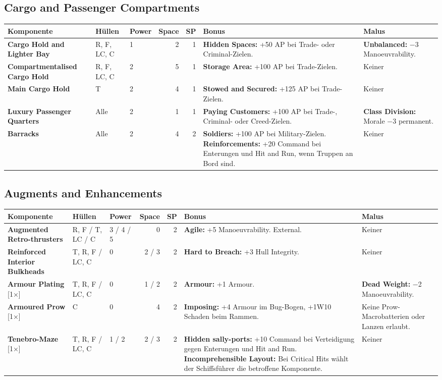 \documentclass[9pt,a4paper]{extarticle}
\newcommand{\plus}[1]{\textcolor{good}{#1}}
\newcommand{\minus}[1]{\textcolor{bad}{#1}}
\newcommand{\nm}[1]{\textbf{#1}}
\newcommand{\eff}[1]{\textbf{#1:}}
\newcommand{\once}{{\monofont\scriptsize\color{ink3}[1×]}}
\begin{document}
\subsection{Cargo and Passenger Compartments}
\begin{xltabular}{\linewidth}{l H P N N Y Y}
\toprule
{}\textbf{Komponente} & \textbf{Hüllen} & \textbf{Power} & \textbf{Space} & \textbf{SP} & \textbf{Bonus} & \textbf{Malus}\\
\midrule
\endhead
\nm{Cargo Hold and Lighter Bay} & R, F, LC, C & 1 & 2 & 1 & \eff{Hidden Spaces} \plus{+50 AP} bei Trade- oder Criminal-Zielen. & \eff{Unbalanced} \minus{−3 Manoeuvrability}.\\
\nm{Compartmentalised Cargo Hold} & R, F, LC, C & 2 & 5 & 1 & \eff{Storage Area} \plus{+100 AP} bei Trade-Zielen. & Keiner\\
\nm{Main Cargo Hold} & T & 2 & 4 & 1 & \eff{Stowed and Secured} \plus{+125 AP} bei Trade-Zielen. & Keiner\\
\nm{Luxury Passenger Quarters} & Alle & 2 & 1 & 1 & \eff{Paying Customers} \plus{+100 AP} bei Trade-, Criminal- oder Creed-Zielen. & \eff{Class Division} \minus{Morale −3} permanent.\\
\nm{Barracks} & Alle & 2 & 4 & 2 & \eff{Soldiers} \plus{+100 AP} bei Military-Zielen. \eff{Reinforcements} \plus{+20 Command} bei Enterungen und Hit and Run, wenn Truppen an Bord sind. & Keiner\\
\bottomrule
\end{xltabular}

\subsection{Augments and Enhancements}
\begin{xltabular}{\linewidth}{l H P N N Y Y}
\toprule
{}\textbf{Komponente} & \textbf{Hüllen} & \textbf{Power} & \textbf{Space} & \textbf{SP} & \textbf{Bonus} & \textbf{Malus}\\
\midrule
\endhead
\nm{Augmented Retro-thrusters} & R, F / T, LC / C & 3 / 4 / 5 & 0 & 2 & \eff{Agile} \plus{+5 Manoeuvrability}. External. & Keiner\\
\nm{Reinforced Interior Bulkheads} & T, R, F / LC, C & 0 & 2 / 3 & 2 & \eff{Hard to Breach} \plus{+3 Hull Integrity}. & Keiner\\
\nm{Armour Plating} \once & T, R, F / LC, C & 0 & 1 / 2 & 2 & \eff{Armour} \plus{+1 Armour}. & \eff{Dead Weight} \minus{−2 Manoeuvrability}.\\
\nm{Armoured Prow} \once & C & 0 & 4 & 2 & \eff{Imposing} \plus{+4 Armour} im Bug-Bogen, \plus{+1W10 Schaden} beim Rammen. & Keine Prow-Macrobatterien oder Lanzen erlaubt.\\
\nm{Tenebro-Maze} \once & T, R, F / LC, C & 1 / 2 & 2 / 3 & 2 & \eff{Hidden sally-ports} \plus{+10 Command} bei Verteidigung gegen Enterungen und Hit and Run. \eff{Incomprehensible Layout} Bei Critical Hits wählt der Schiffsführer die betroffene Komponente. & Keiner\\
\bottomrule
\end{xltabular}
\end{document}
